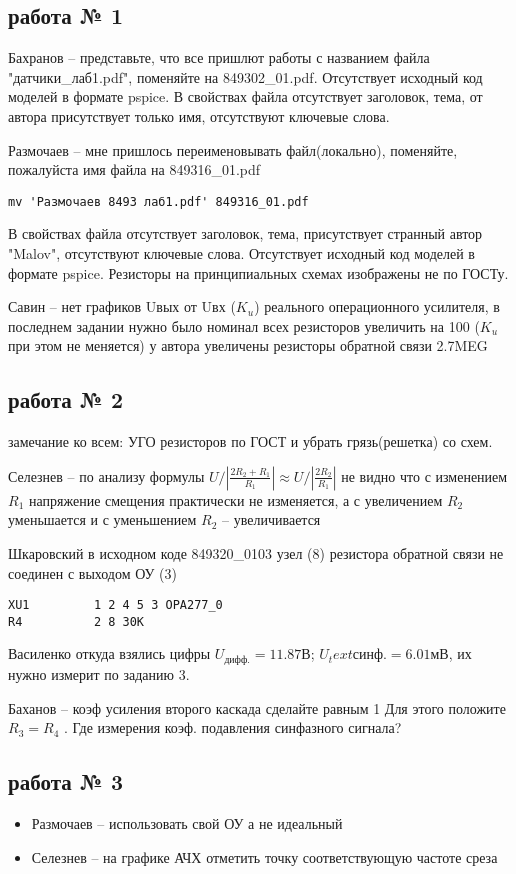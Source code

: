 \subsection{работа № 1}
Бахранов  -- представьте, что все пришлют работы с названием файла "датчики\_лаб1.pdf", поменяйте на  849302\_01.pdf. Отсутствует исходный код моделей в формате pspice.
В свойствах файла отсутствует заголовок, тема, от автора присутствует только имя, отсутствуют ключевые слова.

Размочаев -- мне пришлось переименовывать файл(локально), поменяйте, пожалуйста имя файла на  849316\_01.pdf
\begin{verbatim}
mv 'Размочаев 8493 лаб1.pdf' 849316_01.pdf
\end{verbatim}
В свойствах файла отсутствует заголовок, тема, присутствует странный автор "Malov", отсутствуют ключевые слова. Отсутствует исходный код моделей в формате pspice.
Резисторы на принципиальных схемах изображены не по ГОСТу.

Савин -- нет графиков Uвых от Uвх ($K_u$) реального операционного усилителя, в последнем задании нужно было номинал всех  резисторов увеличить на 100 ($K_u$ при этом не меняется) 
у автора увеличены резисторы обратной связи 2.7MEG 

\subsection{работа № 2}

замечание ко всем: УГО резисторов по ГОСТ и убрать грязь(решетка) со схем.

Селезнев -- по анализу формулы $U/|\frac{2R_2 + R_1}{R_1}| \approx U/|\frac{2R_2}{R_1}|$ не видно что с изменением $R_1$
напряжение смещения практически не изменяется, а с увеличением $R_2$
уменьшается и с уменьшением $R_2$ – увеличивается


Шкаровский в исходном коде 849320\_0103 узел (8) резистора обратной связи не соединен с выходом ОУ (3)
\begin{verbatim}
XU1         1 2 4 5 3 OPA277_0
R4          2 8 30K
\end{verbatim}

Василенко  откуда взялись цифры  $U_\text{дифф.} = 11.87 В$; $U_text{синф.} = 6.01мВ$, их нужно измерит по заданию 3.

Баханов -- коэф усиления второго каскада сделайте равным 1 Для этого положите $R_3=R_4$ . Где измерения коэф. подавления синфазного сигнала?


\subsection{работа № 3}
\begin{itemize}
\item Размочаев -- использовать свой ОУ а не идеальный	
\item Селезнев	-- на графике АЧХ отметить точку соответствующую частоте среза
\end{itemize}


